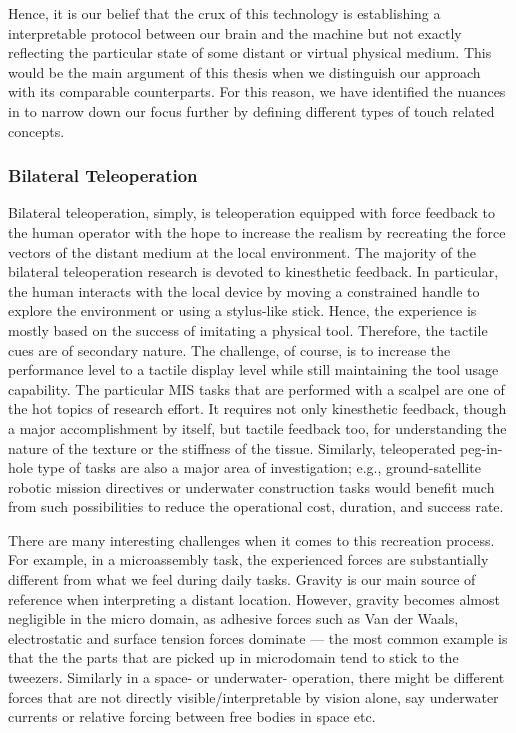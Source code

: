 Hence, it is our belief that the crux of this technology is establishing a interpretable protocol between our brain and the machine but 
not exactly reflecting the particular state of some distant or virtual physical medium. 
This would be the main argument of this thesis when we distinguish our approach with its comparable counterparts. For this reason, we 
have identified the nuances in  to narrow down our focus further by defining different types of touch related 
concepts.



\subsubsection{Bilateral Teleoperation}

Bilateral teleoperation, simply, is teleoperation equipped with force feedback to the human operator with the hope to increase the realism 
by recreating the force vectors of the distant medium at the local environment. The majority of the bilateral teleoperation research is 
devoted to kinesthetic feedback. In particular, the human interacts with the local device by moving a constrained handle to explore the 
environment or using a stylus-like stick. Hence, the experience is mostly based on the success of imitating a physical tool. Therefore, 
the tactile cues are of secondary nature. The challenge, of course, is to increase the performance level to a tactile display level while 
still maintaining the tool usage capability. The particular MIS tasks that are performed with a scalpel are one of the hot topics of 
research effort. It requires not only kinesthetic feedback, though a major accomplishment by itself, but tactile feedback too, for 
understanding the nature of the texture or the stiffness of the tissue. Similarly, teleoperated peg-in-hole type of tasks are also a major 
area of investigation; e.g., ground-satellite robotic mission directives or underwater construction tasks would benefit much from such 
possibilities to reduce the operational cost, duration, and success rate. 



There are many interesting challenges when it comes to this recreation process. For example, in a microassembly task, the experienced 
forces are substantially different from what we feel during daily tasks. Gravity is our main source of reference when interpreting a 
distant location. However, gravity becomes almost negligible in the micro domain, as adhesive forces such as Van der Waals, electrostatic 
and surface tension forces dominate --- the most common example is that the the parts that are picked up in microdomain 
tend to stick to the tweezers. Similarly in a space- or underwater- operation, there might be different forces that are not directly 
visible/interpretable by vision alone, say underwater currents or relative forcing between free bodies in space etc.

